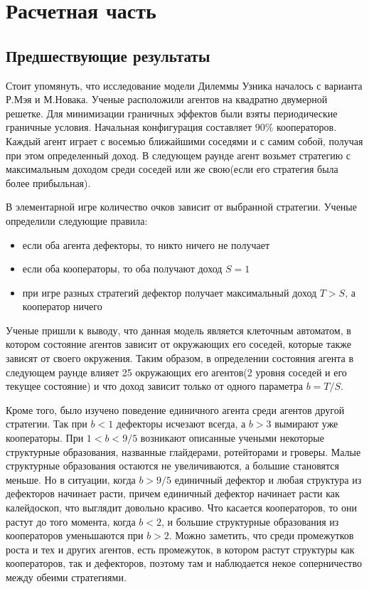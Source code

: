 \documentclass[12pt,a4paper]{article}
\begin{document}
	
	\section{Расчетная часть}
	 
	
	\subsection{Предшествующие результаты}
	
	\par Стоит упомянуть, что исследование модели Дилеммы Узника началось с варианта Р.Мэя и М.Новака. Ученые расположили агентов на квадратно двумерной решетке. Для минимизации граничных эффектов были взяты периодические граничные условия. Начальная конфигурация составляет $90\%$ кооператоров. Каждый агент играет с восемью ближайшими соседями и с самим собой, получая при этом определенный доход. В следующем раунде агент возьмет стратегию с максимальным доходом среди соседей или же свою(если его стратегия была более прибыльная).
	
	\par В элементарной игре количество очков зависит от выбранной стратегии. Ученые определили следующие правила:
	\begin{itemize}
		\item если оба агента дефекторы, то никто ничего не получает
		\item если оба кооператоры, то оба получают доход $S=1$
		\item при игре разных стратегий дефектор получает максимальный доход $T>S$, а кооператор ничего
	\end{itemize}
	
	\par Ученые пришли к выводу, что данная модель является клеточным автоматом, в котором состояние агентов зависит от окружающих его соседей, которые также зависят от своего окружения. Таким образом, в определении состояния агента в следующем раунде влияет 25 окружающих его агентов(2 уровня соседей и его текущее состояние) и что доход зависит только от одного параметра $b=T/S$. 
	
	\par Кроме того, было изучено поведение единичного агента среди агентов другой стратегии. Так при $b<1$ дефекторы исчезают всегда, а $b>3$ вымирают уже кооператоры. При $1<b<9/5$ возникают описанные учеными некоторые структурные образования, названные глайдерами, ротейторами и гроверы. Малые структурные образования остаются не увеличиваются, а большие становятся меньше. Но в ситуации, когда $b>9/5$ единичный дефектор и любая структура из дефекторов начинает расти, причем единичный дефектор начинает расти как калейдоскоп, что выглядит довольно красиво. Что касается кооператоров, то они растут до того момента, когда $b<2$, и большие структурные образования из кооператоров уменьшаются при $b>2$. Можно заметить, что среди промежутков роста и тех и других агентов, есть промежуток, в котором растут структуры как кооператоров, так и дефекторов, поэтому там и наблюдается некое соперничество между обеими стратегиями.
	
\end{document}
